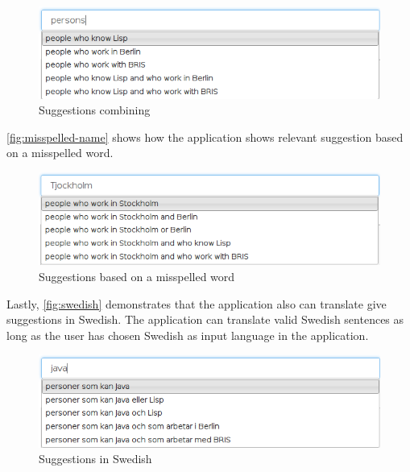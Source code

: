 \begin{figure}[H]
\includegraphics[scale=0.6,keepaspectratio,valign=t]{./gfx/persons.png}
\caption{Suggestions combining  \label{fig:persons}}
\end{figure}

\autoref{fig:misspelled-name} shows how the application shows relevant suggestion based on a misspelled word.

\begin{figure}[H]
\includegraphics[scale=0.6,keepaspectratio,valign=t]{./gfx/misspelled_name.png}
\caption{Suggestions based on a misspelled word\label{fig:misspelled-name}}
\end{figure}

Lastly, \autoref{fig:swedish} demonstrates that the application also can translate give suggestions in Swedish. The application can translate valid Swedish sentences as long as the user has chosen Swedish as input language in the application.

\begin{figure}[H]
\includegraphics[scale=0.6,keepaspectratio,valign=t]{./gfx/swedish.png}
\caption{Suggestions in Swedish\label{fig:swedish}}
\end{figure}